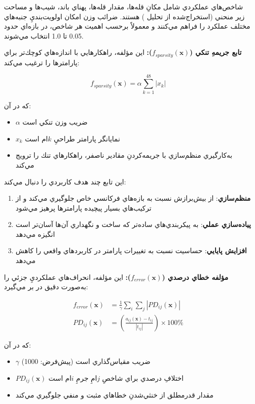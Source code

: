شاخص‌هاي عملكردي شامل مكانِ قله‌ها، مقدار قله‌ها، پهناي باند، شيب‌ها و مساحت زير منحني (استخراج‌شده از تحليل ) هستند. ضرائب وزن امكان اولويت‌بنديِ جنبه‌هاي مختلف عملكرد را فراهم مي‌كنند و معمولاً برحسب اهميت هر شاخص، در بازه‌اي حدود 0.05 تا 1.0 انتخاب مي‌شوند.

\textbf{تابع جريمهِ تنكي ($f_{sparsity}(\mathbf{x})$):} اين مؤلفه، راهكارهايي با اندازه‌هاي كوچك‌تر براي پارامترها را ترغيب مي‌كند:

\begin{equation}\label{Eq.sparsity_penalty_detailed}
f_{sparsity}(\mathbf{x}) = \alpha \sum_{k=1}^{48} |x_k|
\end{equation}

كه در آن:
\begin{itemize}
    \item $\alpha$ ضريب وزن تنكي است
    \item $x_k$ نمايانگر پارامتر طراحيِ $k$ام است
    \item به‌كارگيري منظم‌سازي  با جريمه‌كردنِ مقادير ناصفر، راهكارهاي تنك را ترويج مي‌كند
\end{itemize}

اين تابع چند هدف كاربردي را دنبال مي‌كند:

\begin{enumerate}
    \item \textbf{منظم‌سازي}: از بيش‌برازش نسبت به بازه‌هاي فركانسي خاص جلوگيري مي‌كند و از تركيب‌هاي بسيار پيچيده پارامترها پرهيز مي‌شود
    \item \textbf{پياده‌سازي عملي}: به پيكربندي‌هاي ساده‌تر  كه ساخت و نگهداري آن‌ها آسان‌تر است انگيزه مي‌دهد
    \item \textbf{افزايش پايايي}: حساسيت نسبت به تغييرات پارامتر در كاربردهاي واقعي را كاهش مي‌دهد
\end{enumerate}

\textbf{مؤلفه خطاي درصدي ($f_{error}(\mathbf{x})$):} اين مؤلفه، انحراف‌هاي عملكرديِ جزئي را به‌صورت دقيق در بر مي‌گيرد:

\begin{align}\label{Eq.percentage_error_detailed}
f_{error}(\mathbf{x}) &= \frac{1}{\gamma} \sum_{i} \sum_{j} \left| PD_{ij}(\mathbf{x}) \right|\\
PD_{ij}(\mathbf{x}) &= \left( \frac{a_{ij}(\mathbf{x}) - t_{ij}}{|t_{ij}|} \right) \times 100\%
\end{align}

كه در آن:
\begin{itemize}
    \item $\gamma$ ضريب مقياس‌گذاري است (پيش‌فرض: 1000)
    \item $PD_{ij}(\mathbf{x})$ اختلافِ درصدي براي شاخصِ $j$امِ جرمِ $i$ام است
    \item مقدار قدرمطلق از خنثي‌شدنِ خطاهاي مثبت و منفي جلوگيري مي‌كند
\end{itemize}

